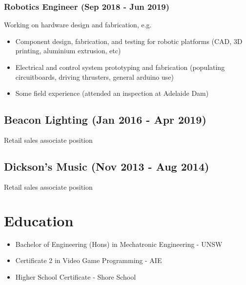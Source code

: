 \documentclass[12pt]{article}
\begin{document}
\begin{FlushLeft}
  \subsubsection*{Robotics Engineer (Sep 2018 - Jun 2019)}
  Working on hardware design and fabrication, e.g.
  \begin{itemize}
  \item Component design, fabrication, and testing for robotic platforms (CAD, 3D printing, aluminium extrusion, etc)
  \item Electrical and control system prototyping and fabrication (populating circuitboards, driving thrusters, general arduino use)
  \item Some field experience (attended an inspection at Adelaide Dam)
  \end{itemize}

  \subsection*{Beacon Lighting (Jan 2016 - Apr 2019)}
  Retail sales associate position

  \subsection*{Dickson's Music (Nov 2013 - Aug 2014)}
  Retail sales associate position
  
  \section*{Education}
  \begin{itemize}
  \item Bachelor of Engineering (Hons) in Mechatronic Engineering - UNSW
  \item Certificate 2 in Video Game Programming - AIE
  \item Higher School Certificate - Shore School 
  \end{itemize}

\end{FlushLeft}
\end{document}

